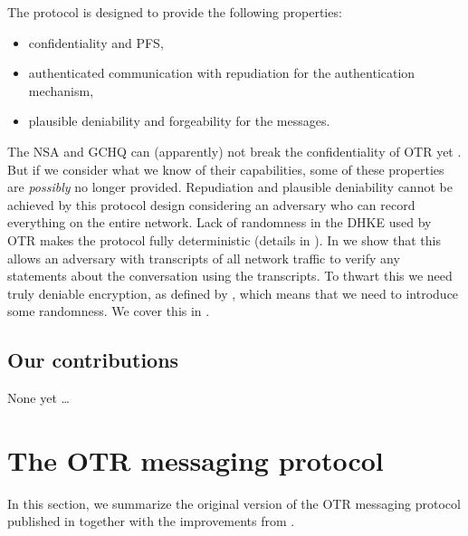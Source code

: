 The protocol is designed to provide the following properties:
\begin{itemize}
  \item confidentiality and \ac{PFS},
  \item authenticated communication with repudiation for the authentication 
    mechanism,
  \item plausible deniability and forgeability for the messages.
\end{itemize}
The \ac{NSA} and \ac{GCHQ} can (apparently) not break the confidentiality of 
\ac{OTR} yet \cite{spiegelotr}.
But if we consider what we know of their capabilities, some of these properties 
are \emph{possibly} no longer provided.
Repudiation and plausible deniability cannot be achieved by this protocol 
design considering an adversary who can record everything on the entire 
network.
Lack of randomness in the \ac{DHKE} \cite{dh} used by \ac{OTR} makes 
the protocol fully deterministic (details in ).
In  we show that this allows an adversary with 
transcripts of all network traffic to verify any statements about the 
conversation using the transcripts.
To thwart this we need truly deniable encryption, as defined by 
\citet{deniablecrypt}, which means that we need to introduce some randomness.
We cover this in .

\subsection{Our contributions}

None yet \dots


\section{The \acs{OTR} messaging protocol}
\label{sec:otr}

In this section, we summarize the original version of the \ac{OTR} messaging 
protocol published in \cite{otr2004} together with the improvements from 
\cite{di2005secure}.


